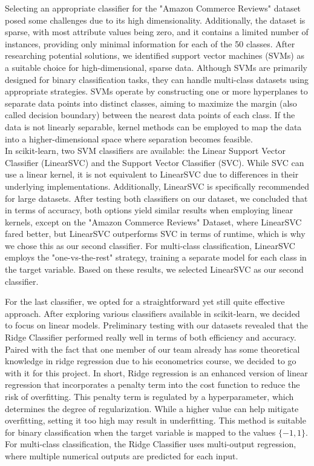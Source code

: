 \documentclass[a4paper,10pt]{article}
\begin{document}
Selecting an appropriate classifier for the "Amazon Commerce Reviews" dataset posed some challenges due to its high dimensionality. Additionally, the dataset is sparse, with most attribute values being zero, and it contains a limited number of instances, providing only minimal information for each of the 50 classes. After researching potential solutions, we identified support vector machines (SVMs) as a suitable choice for high-dimensional, sparse data. Although SVMs are primarily designed for binary classification tasks, they can handle multi-class datasets using appropriate strategies. SVMs operate by constructing one or more hyperplanes to separate data points into distinct classes, aiming to maximize the margin {\color{red}(also called decision boundary)} between the nearest data points of each class. If the data is not linearly separable, kernel methods can be employed to map the data into a higher-dimensional space where separation becomes feasible. \\
In scikit-learn, two SVM classifiers are available: the Linear Support Vector Classifier (LinearSVC) and the Support Vector Classifier (SVC). While SVC can use a linear kernel, it is not equivalent to LinearSVC due to differences in their underlying implementations. Additionally, LinearSVC is specifically recommended for large datasets. After testing both classifiers on our dataset, we concluded that in terms of accuracy, both options yield similar results when employing linear kernels, {\color{red} except on the "Amazon Commerce Reviews" Dataset, where LinearSVC fared better}, but LinearSVC outperforms SVC in terms of runtime, which is why we chose this as our second classifier. For multi-class classification, LinearSVC employs the "one-vs-the-rest" strategy, training a separate model for each class in the target variable. Based on these results, we selected LinearSVC as our second classifier.

For the last classifier, we opted for a straightforward yet still quite effective approach. After exploring various classifiers available in scikit-learn, we decided to focus on linear models. Preliminary testing with our datasets revealed that the Ridge Classifier performed really well in terms of both efficiency and accuracy. Paired with the fact that one member of our team already has some theoretical knowledge in ridge regression due to his econometrics course, we decided to go with it for this project. 
In short, Ridge regression is an enhanced version of linear regression that incorporates a penalty term into the cost function to reduce the risk of overfitting. This penalty term is regulated by a hyperparameter, which determines the degree of regularization. While a higher value can help mitigate overfitting, setting it too high may result in underfitting. This method is suitable for binary classification when the target variable is mapped to the values $\{-1, 1\}$. For multi-class classification, the Ridge Classifier uses multi-output regression, where multiple numerical outputs are predicted for each input.
\end{document}
